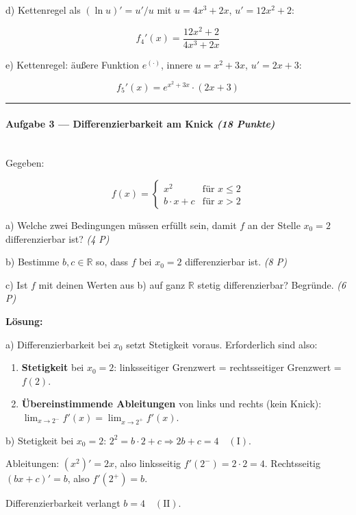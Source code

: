 \documentclass[11pt, a4paper]{article}
\begin{document}
d) Kettenregel als $(\ln u)' = u'/u$ mit $u = 4x^3 + 2x$, $u' = 12x^2 + 2$:

\[
f_4'(x) = \frac{12x^2 + 2}{4x^3 + 2x}
\]


e) Kettenregel: äußere Funktion $e^{(\cdot)}$, innere $u = x^2 + 3x$, $u' = 2x + 3$:

\[
f_5'(x) = e^{x^2 + 3x}\cdot (2x+3)
\]



\noindent\textcolor{rulegray}{\rule{\linewidth}{0.4pt}}


\paragraph{Aufgabe 3 — Differenzierbarkeit am Knick \textit{(18 Punkte)}}\mbox{}\\[2pt]

Gegeben:


\[
f(x) = \begin{cases} x^2 & \text{für } x \leq 2 \\ b\cdot x + c & \text{für } x > 2 \end{cases}
\]


a) Welche zwei Bedingungen müssen erfüllt sein, damit $f$ an der Stelle $x_0 = 2$ differenzierbar ist? \textit{(4 P)}

b) Bestimme $b, c \in \mathbb{R}$ so, dass $f$ bei $x_0 = 2$ differenzierbar ist. \textit{(8 P)}

c) Ist $f$ mit deinen Werten aus b) auf ganz $\mathbb{R}$ stetig differenzierbar? Begründe. \textit{(6 P)}


\textbf{Lösung:}


a) Differenzierbarkeit bei $x_0$ setzt Stetigkeit voraus. Erforderlich sind also:

\begin{enumerate}
  \item \textbf{Stetigkeit} bei $x_0=2$: linksseitiger Grenzwert = rechtsseitiger Grenzwert = $f(2)$.
  \item \textbf{Übereinstimmende Ableitungen} von links und rechts (kein Knick): $\lim_{x\to 2^-} f'(x) = \lim_{x\to 2^+} f'(x)$.
\end{enumerate}

b) Stetigkeit bei $x_0 = 2$: $2^2 = b\cdot 2 + c \Rightarrow 2b + c = 4 \quad (\text{I})$.


Ableitungen: $(x^2)' = 2x$, also linksseitig $f'(2^-) = 2\cdot 2 = 4$. Rechtsseitig $(bx+c)' = b$, also $f'(2^+) = b$.


Differenzierbarkeit verlangt $b = 4 \quad (\text{II})$.
\end{document}

